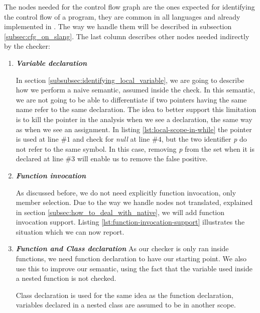 The nodes needed for the control flow graph are the ones expected for identifying the control flow of a program, they are common in all languages and already implemented in \slang{}. 
The way we handle them will be described in subsection \ref{subsec:cfg_on_slang}.
The last column describes other nodes needed indirectly by the checker:
\begin{enumerate}
	\item \textbf{\textit{Variable declaration}} \newline
	
	
	In section \ref{subsubsec:identifying_local_variable}, we are going to describe how we perform a naive semantic, assumed inside the check.
	In this semantic, we are not going to be able to differentiate if two pointers having the same name refer to the same declaration.
	The idea to better support this limitation is to kill the pointer in the analysis when we see a declaration, the same way as when we see an assignment.
	In listing \ref{lst:local-scope-in-while} the pointer is used at line $\#1$ and check for \emph{null} at line $\#4$, but the two identifier \emph{p} do not refer to the same symbol.
	In this case, removing \emph{p} from the set when it is declared at line $\#3$ will enable us to remove the false positive.

	\item \textbf{\textit{Function invocation}} \newline
	
	
	As discussed before, we do not need explicitly function invocation, only member selection. 
	Due to the way we handle nodes not translated, explained in section \ref{subsec:how_to_deal_with_native}, we will add function invocation support.
	Listing \ref{lst:function-invocation-support} illustrates the situation which we can now report.
	
	\item \textbf{\textit{Function and Class declaration}} \newline
	As our checker is only ran inside functions, we need function declaration to have our starting point. 
	We also use this to improve our semantic, using the fact that the variable used inside a nested function is not checked.
	
	Class declaration is used for the same idea as the function declaration, variables declared in a nested class are assumed to be in another scope.
\end{enumerate}

